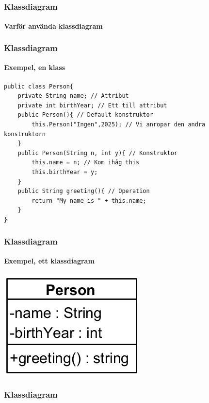 \documentclass[aspectratio=169]{beamer}
\begin{document}
\begin{frame}
    \frametitle{Klassdiagram}
    \framesubtitle{Varför använda klassdiagram}




\end{frame}

\begin{frame}[fragile]
    \frametitle{Klassdiagram}
    \framesubtitle{Exempel, en klass}

    \begin{lstlisting}
public class Person{
    private String name; // Attribut
    private int birthYear; // Ett till attribut
    public Person(){ // Default konstruktor
        this.Person("Ingen",2025); // Vi anropar den andra konstruktorn
    }
    public Person(String n, int y){ // Konstruktor
        this.name = n; // Kom ihåg this
        this.birthYear = y;
    }
    public String greeting(){ // Operation
        return "My name is " + this.name;
    }
}
    \end{lstlisting}

\end{frame}

\begin{frame}
    \frametitle{Klassdiagram}
    \framesubtitle{Exempel, ett klassdiagram}

    \centering
    \includegraphics[]{person.png}

\end{frame}

\begin{frame}
    \frametitle{Klassdiagram}
    \framesubtitle{}




\end{frame}
\end{document}
